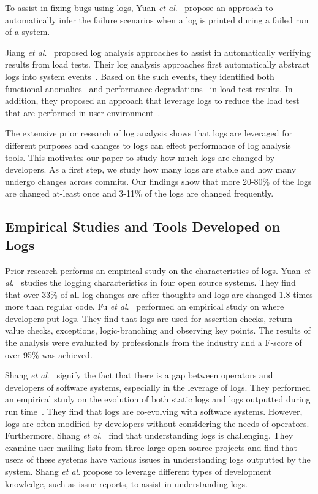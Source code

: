 To assist in fixing bugs using logs, Yuan \emph{et al$.$}~\cite{Yuan:2010:SED:1736020.1736038} propose an approach to automatically infer the failure scenarios when a log is printed during a failed run of a system.


Jiang \textsl{et al$ . $}~\cite{Jiang:2008:AAA:1400155.1400158,JiangICSM2008,JiangICSM20092,Jiang:2010:ICS:1850000.1850068} proposed log analysis approaches to assist in automatically verifying results from load tests. Their log analysis approaches first automatically abstract logs into system events~\cite{Jiang:2008:AAA:1400155.1400158}. Based on the such events, they identified both functional anomalies~\cite{JiangICSM2008} and performance degradations~\cite{JiangICSM20092} in load test results. In addition, they proposed an approach that leverage logs to reduce the load test that are performed in user environment~\cite{Jiang:2010:ICS:1850000.1850068}.

The extensive prior research of log analysis shows that logs are leveraged for different purposes and changes to logs can effect performance  of log analysis tools. This motivates our paper to study how much logs are changed by developers. As a first step, we study how many logs are stable and how many undergo changes across commits. Our findings show that more 20-80\% of the logs are changed at-least once and 3-11\% of the logs are changed frequently. 


\subsection{Empirical Studies and Tools Developed on Logs}


Prior research performs an empirical study on the characteristics of logs. Yuan \textsl{et al}$ . $~\cite{Characterizinglogs} studies the logging characteristics in four open source systems. They find that over 33\% of all log changes are after-thoughts and logs are changed 1.8 times more than regular code. Fu \textsl{et al$.$}~\cite{Fu1} performed an empirical study on where developers put logs. They find that logs are used for assertion checks, return value checks, exceptions, logic-branching and observing key points. The results of the analysis were evaluated by professionals from the industry and a F-score of over 95\% was achieved. 


Shang \textsl{et al$ . $}~\cite{IanGap} signify the fact that there is a gap between operators and developers of software systems, especially in the leverage of logs. They performed an empirical study on the evolution of both static logs and logs outputted during run time~\cite{EMSEIAN,PaperIanCIIII}. They find that logs are co-evolving with software systems. However, logs are often modified by developers without considering the needs of operators. Furthermore, Shang\textsl{ et al$ . $}~\cite{IanIcesm} find that understanding logs is challenging. They examine user mailing lists from three large open-source projects and find that users of these systems have various issues in understanding logs outputted by the system. Shang\textsl{ et al$ . $} propose to leverage different types of development knowledge, such as issue reports, to assist in understanding logs. 

